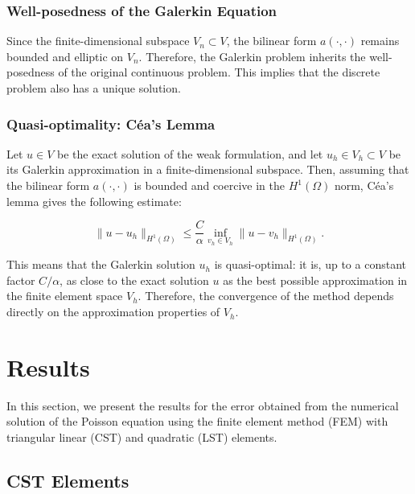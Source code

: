 \documentclass[12pt]{article}
\begin{document}
\subsubsection*{Well-posedness of the Galerkin Equation}

Since the finite-dimensional subspace \( V_n \subset V \), the bilinear form \( a(\cdot, \cdot) \) remains bounded and elliptic on \( V_n \). Therefore, the Galerkin problem inherits the well-posedness of the original continuous problem. This implies that the discrete problem also has a unique solution.

\subsubsection*{Quasi-optimality: Céa's Lemma}

Let \( u \in V \) be the exact solution of the weak formulation, and let \( u_h \in V_h \subset V \) be its Galerkin approximation in a finite-dimensional subspace. Then, assuming that the bilinear form \( a(\cdot, \cdot) \) is bounded and coercive in the \( H^1(\Omega) \) norm, Céa's lemma gives the following estimate:

\begin{equation}
\| u - u_h \|_{H^1(\Omega)} \leq \frac{C}{\alpha} \inf_{v_h \in V_h} \| u - v_h \|_{H^1(\Omega)}.
\end{equation}

This means that the Galerkin solution \( u_h \) is quasi-optimal: it is, up to a constant factor \( C / \alpha \), as close to the exact solution \( u \) as the best possible approximation in the finite element space \( V_h \). Therefore, the convergence of the method depends directly on the approximation properties of \( V_h \).


\newpage
\section{Results}

In this section, we present the results for the error obtained from the numerical solution of the Poisson equation using the finite element method (FEM) with triangular linear (CST) and quadratic (LST) elements.

\subsection{CST Elements}
\end{document}
